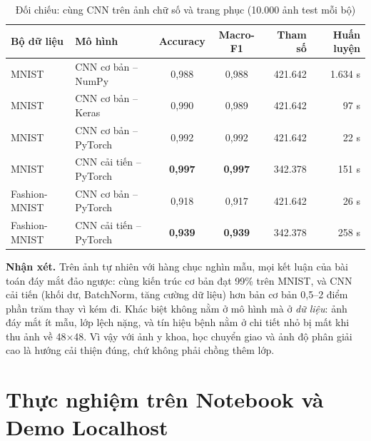 \begin{table}[H]
\centering
\caption{Đối chiếu: cùng CNN trên ảnh chữ số và trang phục (10.000 ảnh test mỗi bộ)}
\label{tab:ch3-domains}
\small
\begin{tabular}{@{}llccrr@{}}
\toprule
\textbf{Bộ dữ liệu} & \textbf{Mô hình} & \textbf{Accuracy} & \textbf{Macro-F1} & \textbf{Tham số} & \textbf{Huấn luyện} \\
\midrule
MNIST & CNN cơ bản – NumPy & 0,988 & 0,988 & 421.642 & 1.634 s \\
MNIST & CNN cơ bản – Keras & 0,990 & 0,989 & 421.642 & 97 s \\
MNIST & CNN cơ bản – PyTorch & 0,992 & 0,992 & 421.642 & 22 s \\
MNIST & CNN cải tiến – PyTorch & \textbf{0,997} & \textbf{0,997} & 342.378 & 151 s \\
\midrule
Fashion-MNIST & CNN cơ bản – PyTorch & 0,918 & 0,917 & 421.642 & 26 s \\
Fashion-MNIST & CNN cải tiến – PyTorch & \textbf{0,939} & \textbf{0,939} & 342.378 & 258 s \\
\bottomrule
\end{tabular}
\end{table}

\textbf{Nhận xét.} Trên ảnh tự nhiên với hàng chục nghìn mẫu, mọi kết luận của bài toán đáy mắt đảo ngược: cùng kiến trúc cơ bản đạt 99\% trên MNIST, và CNN cải tiến (khối dư, BatchNorm, tăng cường dữ liệu) hơn bản cơ bản 0,5–2 điểm phần trăm thay vì kém đi. Khác biệt không nằm ở mô hình mà ở \emph{dữ liệu}: ảnh đáy mắt ít mẫu, lớp lệch nặng, và tín hiệu bệnh nằm ở chi tiết nhỏ bị mất khi thu ảnh về 48×48. Vì vậy với ảnh y khoa, học chuyển giao và ảnh độ phân giải cao là hướng cải thiện đúng, chứ không phải chồng thêm lớp.

\section{Thực nghiệm trên Notebook và Demo Localhost}
\label{sec:ch3-notebook-demo}

